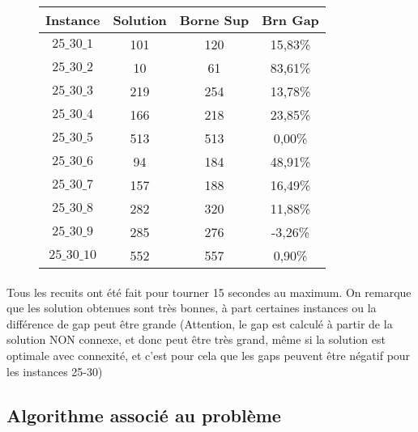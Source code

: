 \documentclass[a4paper, 11pt]{article} %
\begin{document}
\begin{center}
\begin{figure}[H]
      \begin{tabular}{|c|c|c|c|}
      \hline 
        Instance & Solution & Borne Sup & Brn Gap  \\ \hline
$25\_30\_1$ &  101 & 120 & 15,83\% \\ \hline
$25\_30\_2$ &  10 &  61 &  83,61\% \\ \hline
$25\_30\_3$ &  219 & 254 & 13,78\% \\ \hline
$25\_30\_4$ &  166 & 218 & 23,85\% \\ \hline
$25\_30\_5$ &  513 & 513 & 0,00\% \\ \hline
$25\_30\_6$ &  94 &  184 & 48,91\% \\ \hline
$25\_30\_7$ &  157 & 188 & 16,49\% \\ \hline
$25\_30\_8$ &  282 & 320 & 11,88\% \\ \hline
$25\_30\_9$ &  285 & 276 & -3,26\% \\ \hline
$25\_30\_10$ & 552 & 557 & 0,90\% \\ \hline
      \end{tabular}
\end{figure}
\end{center}

\paragraph*{}

Tous les recuits ont été fait pour tourner 15 secondes au maximum. On remarque que les solution obtenues sont très bonnes, à part certaines instances ou la différence de gap peut être grande (Attention, le gap est calculé à partir de la solution NON connexe, et donc peut être très grand, même si la solution est optimale avec connexité, et c'est pour cela que les gaps peuvent être négatif pour les instances 25-30)


\subsection{Algorithme associé au problème}
\end{document}
